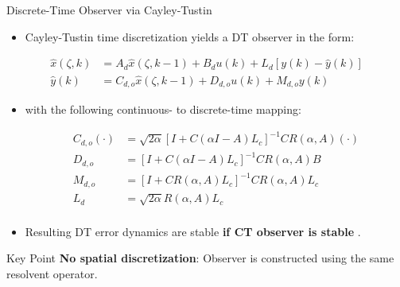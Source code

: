 \documentclass[8pt]{beamer}
\let\oldcitep\citep
\renewcommand{\citep}[1]{\textcolor{gray}{\oldcitep{#1}}}
\begin{document}
\begin{frame}{Discrete-Time Observer via Cayley-Tustin}
\begin{itemize}
    \item Cayley-Tustin time discretization yields a DT observer in the form:
\end{itemize}
\begin{small}
\begin{equation} \label{eq:observer_discrete}
    \begin{aligned}
        \hat{x}(\zeta, k) &= A_d \hat{x}(\zeta, k-1) + B_d u(k) + {L}_d [y(k) - \hat{y}(k)] \\
        \hat{y}(k) &= C_{d,o} \hat{x}(\zeta, k-1) + D_{d,o} u(k) + {M}_{d,o} y(k)
    \end{aligned}
\end{equation}
\end{small}
\begin{itemize}
    \item with the following continuous- to discrete-time mapping:
\begin{small}
\begin{equation} \label{eq:observer_discrete_CDLM}
    \begin{aligned}
        C_{d,o} (\cdot) &= \sqrt{2\alpha} \left[ I + C (\alpha I - A) {L}_c \right]^{-1} C {R}(\alpha, A) (\cdot) \\
        D_{d,o} &= \left[ I + C (\alpha I - A) {L}_c \right]^{-1} C {R}(\alpha, A) B \\
        {M}_{d,o} &= \left[ I + C {R}(\alpha, A) {L}_c \right]^{-1} C {R}(\alpha, A) {L}_c \\
        {L}_d &= \sqrt{2\alpha} {R}(\alpha, A) {L}_c \\
    \end{aligned}
\end{equation}
\end{small}
    \item Resulting DT error dynamics are stable \textbf{if CT observer is stable} \citep{xu2016state}.
\end{itemize}

\begin{block}{Key Point}
\textbf{No spatial discretization}: Observer is constructed using the same resolvent operator.
\end{block}
\end{frame}
\end{document}
